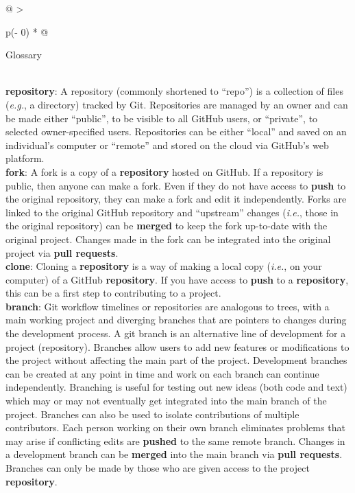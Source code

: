 \begin{tablenos:no-prefix-table-caption}

\begin{longtable}[]{@{}
  >{\raggedright\arraybackslash}p{(\columnwidth - 0\tabcolsep) * }@{}}
\toprule
\begin{minipage}[b]{\linewidth}\raggedright
Glossary
\end{minipage} \\
\midrule
\endhead
\textbf{repository}: A repository (commonly shortened to ``repo'') is a collection of files (\emph{e.g.}, a directory) tracked by Git. Repositories are managed by an owner and can be made either ``public'', to be visible to all GitHub users, or ``private'', to selected owner-specified users. Repositories can be either ``local'' and saved on an individual's computer or ``remote'' and stored on the cloud via GitHub's web platform. \\
\textbf{fork}: A fork is a copy of a \textbf{repository} hosted on GitHub. If a repository is public, then anyone can make a fork. Even if they do not have access to \textbf{push} to the original repository, they can make a fork and edit it independently. Forks are linked to the original GitHub repository and ``upstream'' changes (\emph{i.e.}, those in the original repository) can be \textbf{merged} to keep the fork up-to-date with the original project. Changes made in the fork can be integrated into the original project via \textbf{pull requests}. \\
\textbf{clone}: Cloning a \textbf{repository} is a way of making a local copy (\emph{i.e.}, on your computer) of a GitHub \textbf{repository}. If you have access to \textbf{push} to a \textbf{repository}, this can be a first step to contributing to a project. \\
\textbf{branch}: Git workflow timelines or repositories are analogous to trees, with a main working project and diverging branches that are pointers to changes during the development process. A git branch is an alternative line of development for a project (repository). Branches allow users to add new features or modifications to the project without affecting the main part of the project. Development branches can be created at any point in time and work on each branch can continue independently. Branching is useful for testing out new ideas (both code and text) which may or may not eventually get integrated into the main branch of the project. Branches can also be used to isolate contributions of multiple contributors. Each person working on their own branch eliminates problems that may arise if conflicting edits are \textbf{pushed} to the same remote branch. Changes in a development branch can be \textbf{merged} into the main branch via \textbf{pull requests}. Branches can only be made by those who are given access to the project \textbf{repository}. \\

\end{longtable}
\end{tablenos:no-prefix-table-caption}
